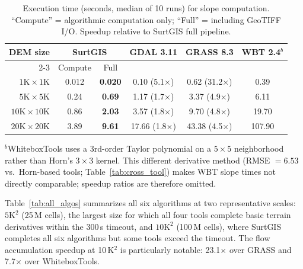 \documentclass[preprint,review,12pt,authoryear]{elsarticle}
\begin{document}
\begin{table}[htbp]
\centering
\caption{Execution time (seconds, median of 10 runs) for slope computation. ``Compute'' = algorithmic computation only; ``Full'' = including GeoTIFF I/O. Speedup relative to SurtGIS full pipeline.}
\label{tab:slope_results}
\begin{tabular}{@{}rccccc@{}}
\toprule
DEM size & \multicolumn{2}{c}{SurtGIS} & GDAL 3.11 & GRASS 8.3 & WBT 2.4$^{b}$ \\
\cmidrule(lr){2-3}
 & Compute & Full & & & \\
\midrule
$1\text{K} \times 1\text{K}$     & 0.012 & \textbf{0.020} & 0.10 (5.1$\times$) & 0.62 (31.2$\times$) & 0.39 \\
$5\text{K} \times 5\text{K}$     & 0.24  & \textbf{0.69}  & 1.17 (1.7$\times$) & 3.37 (4.9$\times$)  & 6.11 \\
$10\text{K} \times 10\text{K}$   & 0.86  & \textbf{2.03}  & 3.57 (1.8$\times$) & 9.70 (4.8$\times$)  & 19.70 \\
$20\text{K} \times 20\text{K}$   & 3.89  & \textbf{9.61}   & 17.66 (1.8$\times$) & 43.38 (4.5$\times$)  & 107.90 \\
\bottomrule
\end{tabular}
\smallskip

{\footnotesize $^{b}$WhiteboxTools uses a 3rd-order Taylor polynomial on a $5 \times 5$ neighborhood \citep{florinsky2016} rather than Horn's $3 \times 3$ kernel. This different derivative method (RMSE $= 6.53$\textdegree{} vs.\ Horn-based tools; Table~\ref{tab:cross_tool}) makes WBT slope times not directly comparable; speedup ratios are therefore omitted.}
\end{table}

Table~\ref{tab:all_algos} summarizes all six algorithms at two representative scales: $5\text{K}^2$ (25\,M cells), the largest size for which all four tools complete basic terrain derivatives within the 300\,s timeout, and $10\text{K}^2$ (100\,M cells), where SurtGIS completes all six algorithms but some tools exceed the timeout. The flow accumulation speedup at 10\,K$^2$ is particularly notable: 23.1$\times$ over GRASS and 7.7$\times$ over WhiteboxTools.
\end{document}
